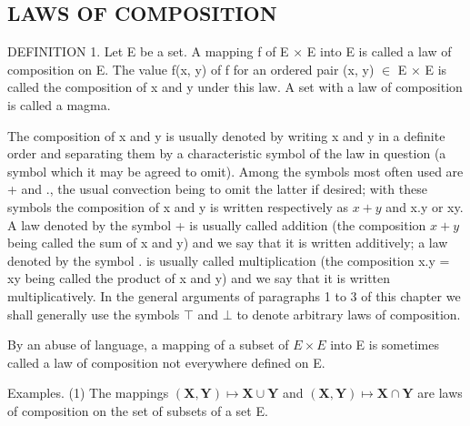 \subsection{LAWS OF COMPOSITION}

DEFINITION 1. Let E be a set. A mapping f of E × E into E is called a law of composition on E. The value f(x, y) of f for an ordered pair (x, y) \ensuremath{\in} E × E is called the composition of x and y under this law. A set with a law of composition is called a magma.

The composition of x and y is usually denoted by writing x and y in a definite order and separating them by a characteristic symbol of the law in question (a symbol which it may be agreed to omit). Among the symbols most often used are + and ., the usual convection being to omit the latter if desired; with these symbols the composition of x and y is written respectively as \(x + y\) and x.y or xy. A law denoted by the symbol + is usually called addition (the composition \(x + y\) being called the sum of x and y) and we say that it is written additively; a law denoted by the symbol . is usually called multiplication (the composition x.y = xy being called the product of x and y) and we say that it is written multiplicatively. In the general arguments of paragraphs 1 to 3 of this chapter we shall generally use the symbols \(\top\) and \(\bot\) to denote arbitrary laws of composition.

By an abuse of language, a mapping of a subset of \(E \times E\) into E is sometimes called a law of composition not everywhere defined on E.

Examples. (1) The mappings \((\mathbf{X},\mathbf{Y})\mapsto \mathbf{X}\cup \mathbf{Y}\) and \((\mathbf{X},\mathbf{Y})\mapsto \mathbf{X}\cap \mathbf{Y}\) are laws of composition on the set of subsets of a set E.

